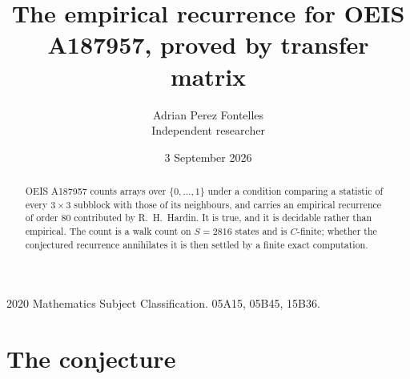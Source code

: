 \documentclass[11pt,a4paper]{article}
\title{The empirical recurrence for OEIS A187957, proved by transfer matrix}
\author{Adrian Perez Fontelles\\ \small Independent researcher}
\date{3 September 2026}
\theoremstyle{plain}
\theoremstyle{definition}
\begin{document}
\maketitle

\begin{abstract}
OEIS A187957 counts arrays over $\{0,\dots,1\}$ under a condition comparing a statistic of
every $3\times3$ subblock with those of its neighbours, and carries an empirical recurrence
of order $80$ contributed by R.~H.~Hardin. It is true, and it is decidable rather than
empirical. The count is a walk count on $S=2816$ states and is $C$-finite; whether the
conjectured recurrence annihilates it is then settled by a finite exact computation.
\end{abstract}

\noindent\small 2020 Mathematics Subject Classification. 05A15, 05B45, 15B36.\normalsize

\section{The conjecture}
\end{document}
